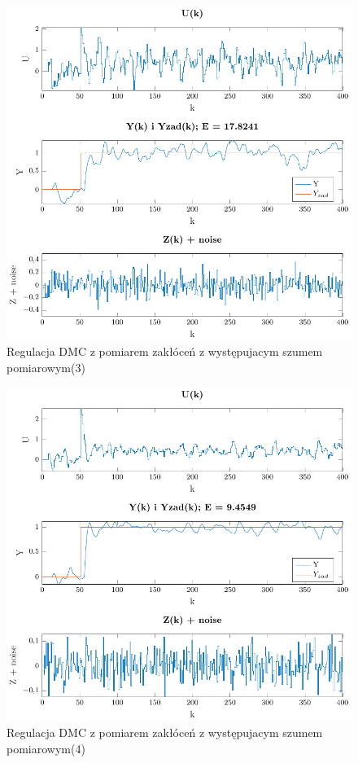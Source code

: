 \documentclass[a4paper,titlepage,11pt,twosides,floatssmall]{mwrep}
\begin{document}
\begin{figure}[h]
	\centering
	\includegraphics[scale=0.85]{../../Lab2/PDF_rysunki/Z7_Szum3.pdf}
	\caption{Regulacja DMC z pomiarem zakłóceń z występujacym szumem pomiarowym(3)}
	\label{szum3}
\end{figure}


\begin{figure}[h]
	\centering
	\includegraphics[scale=0.85]{../../Lab2/PDF_rysunki/Z7_Szum4.pdf}
	\caption{Regulacja DMC z pomiarem zakłóceń z występujacym szumem pomiarowym(4)}
	\label{szum4}
\end{figure}
\end{document}
